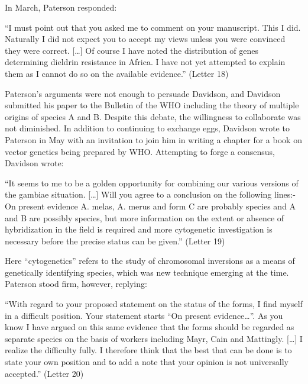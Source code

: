 \documentclass[a4paper,11pt,abstracton,hidelinks]{scrartcl}
\begin{document}
In March, Paterson responded:


\begin{displayquote}
``I must point out that you asked me to comment on your manuscript. This I did. Naturally I did not expect you to accept my views unless you were convinced they were correct. [\ldots] Of course I have noted the distribution of genes determining dieldrin resistance in Africa. I have not yet attempted to explain them as I cannot do so on the available evidence.'' (Letter 18)
\end{displayquote}


Paterson's arguments were not enough to persuade Davidson, and Davidson submitted his paper to the Bulletin of the WHO including the theory of multiple origins of species A and B.
%
Despite this debate, the willingness to collaborate was not diminished.
%
In addition to continuing to exchange eggs, Davidson wrote to Paterson in May with an invitation to join him in writing a chapter for a book on vector genetics being prepared by WHO.
%
Attempting to forge a consensus, Davidson wrote:


\begin{displayquote}
``It seems to me to be a golden opportunity for combining our various versions of the gambiae situation. [\ldots] Will you agree to a conclusion on the following lines:- On present evidence A. melas, A. merus and form C are probably species and A and B are possibly species, but more information on the extent or absence of hybridization in the field is required and more cytogenetic investigation is necessary before the precise status can be given.'' (Letter 19)
\end{displayquote}


Here ``cytogenetics'' refers to the study of chromosomal inversions as a means of genetically identifying species, which was new technique emerging at the time.
%
Paterson stood firm, however, replying:


\begin{displayquote}
``With regard to your proposed statement on the status of the forms, I find myself in a difficult position. Your statement starts ``On present evidence\ldots''. As you know I have argued on this same evidence that the forms should be regarded as separate species on the basis of workers including Mayr, Cain and Mattingly. [\ldots] I realize the difficulty fully. I therefore think that the best that can be done is to state your own position and to add a note that your opinion is not universally accepted.'' (Letter 20)
\end{displayquote}
\end{document}
